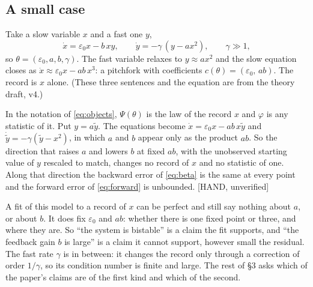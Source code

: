 \documentclass[11pt]{article}
\newenvironment{newtext}{\par\color{teal!55!black}}{\par}
\begin{document}
\begin{newtext}
\subsection{A small case}\label{sec:small}
Take a slow variable $x$ and a fast one $y$,
\begin{equation}
\dot x=\varepsilon_0 x-b\,xy,\qquad \dot y=-\gamma\,(y-a x^2),\qquad \gamma\gg1,
\label{eq:small}
\end{equation}
so $\theta=(\varepsilon_0,a,b,\gamma)$. The fast variable relaxes to $y\approx ax^2$ and the slow equation closes as $\dot x\approx\varepsilon_0x-ab\,x^3$: a pitchfork with coefficients $c(\theta)=(\varepsilon_0,\,ab)$. The record is $x$ alone. (These three sentences and the equation are from the theory draft, v4.)

In the notation of \eqref{eq:objects}, $\Psi(\theta)$ is the law of the record $x$ and $\varphi$ is any statistic of it. Put $y=a\tilde y$. The equations become $\dot x=\varepsilon_0x-ab\,x\tilde y$ and $\dot{\tilde y}=-\gamma(\tilde y-x^2)$, in which $a$ and $b$ appear only as the product $ab$. So the direction that raises $a$ and lowers $b$ at fixed $ab$, with the unobserved starting value of $y$ rescaled to match, changes no record of $x$ and no statistic of one. Along that direction the backward error of \eqref{eq:beta} is the same at every point and the forward error of \eqref{eq:forward} is unbounded. [HAND, unverified]

A fit of this model to a record of $x$ can be perfect and still say nothing about $a$, or about $b$. It does fix $\varepsilon_0$ and $ab$: whether there is one fixed point or three, and where they are. So ``the system is bistable'' is a claim the fit supports, and ``the feedback gain $b$ is large'' is a claim it cannot support, however small the residual. The fast rate $\gamma$ is in between: it changes the record only through a correction of order $1/\gamma$, so its condition number is finite and large. The rest of \S3 asks which of the paper's claims are of the first kind and which of the second.
\end{newtext}
\end{document}
